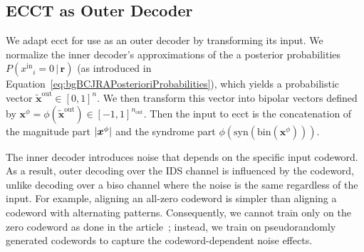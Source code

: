 \documentclass[conference,letterpaperu]{IEEEtran}
\DeclarePairedDelimiter\abs{\lvert}{\rvert}%
\newcommand{\vv}{\ensuremath{\,\vert\,}}
\newcommand{\yinIx}{\ensuremath{x^{\text{in}}}}
\newcommand{\nout}{\ensuremath{n_{\text{out}}}}
\newcommand{\rec}{\ensuremath{\bm{r}}}
\newcommand{\bipolar}{\ensuremath{\phi}}
\newcommand{\syndrome}{\ensuremath{\text{syn}}}
\newcommand{\bin}{\ensuremath{\text{bin}}}
\newcommand{\ybipolar}{\ensuremath{\bm{x}^{\bipolar}}}
\newcommand{\normalizedInner}{\ensuremath{\tilde{\bm{x}}^\text{out}}}
\begin{document}
\subsection{ECCT as Outer Decoder}
\label{sec:MethodologyOuterECCT}
We adapt \ac{ecct} for use as an outer decoder by transforming its input. We normalize the inner decoder's approximations of the a posterior probabilities $P(\yinIx_i = 0 \vv \rec)$ (as introduced in Equation~\eqref{eq:bgBCJRAPosterioriProbabilities}), which yields a probabilistic vector $\normalizedInner \in [0, 1]^n$. We then transform this vector into bipolar vectors defined by $\ybipolar = \bipolar\left(\normalizedInner\right) \in [-1, 1]^{\nout}$. Then the input to \ac{ecct} is the concatenation of the magnitude part $\abs{\ybipolar}$ and the syndrome part $\bipolar\left(\syndrome\left(\bin\left(\ybipolar\right)\right)\right)$.

The inner decoder introduces noise that depends on the specific input codeword. As a result, outer decoding over the IDS channel is influenced by the codeword, unlike decoding over a \ac{biso} channel where the noise is the same regardless of the input. For example, aligning an all-zero codeword is simpler than aligning a codeword with alternating patterns. Consequently, we cannot train only on the zero codeword as done in the article~\cite{choukrounErrorCorrectionCode2022b}; instead, we train on pseudorandomly generated codewords to capture the codeword-dependent noise effects.
\end{document}
